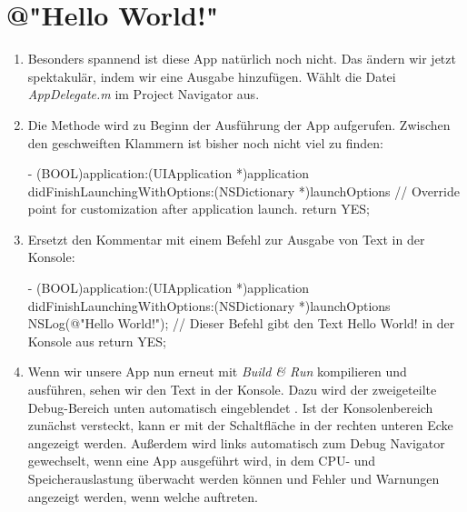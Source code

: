 \documentclass[parskip=half, final]{scrreprt}
\begin{document}
\section{@"{}Hello World!"{}}

\begin{enumerate}

\item Besonders spannend ist diese App natürlich noch nicht. Das ändern wir jetzt spektakulär, indem wir eine Ausgabe hinzufügen. Wählt die Datei \emph{AppDelegate.m} im Project Navigator aus.

\item Die Methode  wird zu Beginn der Ausführung der App aufgerufen. Zwischen den geschweiften Klammern ist bisher noch nicht viel zu finden:

\begin{objclst}
- (BOOL)application:(UIApplication *)application didFinishLaunchingWithOptions:(NSDictionary *)launchOptions {
    // Override point for customization after application launch.
    return YES;
}
\end{objclst}

\item Ersetzt den Kommentar mit einem Befehl zur Ausgabe von Text in der Konsole:

\begin{objclst}
- (BOOL)application:(UIApplication *)application didFinishLaunchingWithOptions:(NSDictionary *)launchOptions {
    NSLog(@"Hello World!"); // Dieser Befehl gibt den Text Hello World! in der Konsole aus
    return YES;
}
\end{objclst}

\item Wenn wir unsere App nun erneut mit \emph{Build \& Run} kompilieren und ausführen, sehen wir den Text  in der Konsole. Dazu wird der zweigeteilte Debug-Bereich unten automatisch eingeblendet . Ist der Konsolenbereich zunächst versteckt, kann er mit der Schaltfläche in der rechten unteren Ecke angezeigt werden. Außerdem wird links automatisch zum Debug Navigator gewechselt, wenn eine App ausgeführt wird, in dem CPU- und Speicherauslastung überwacht werden können und Fehler und Warnungen angezeigt werden, wenn welche auftreten.


\end{enumerate}
\end{document}
